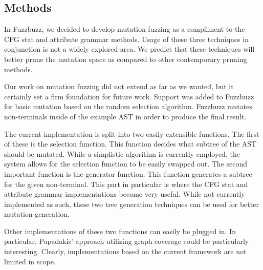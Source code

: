\subsection{Methods}

In Fuzzbuzz, we decided to develop mutation fuzzing as a compliment to
the CFG stat and attribute grammar methods. Usage of these three
techniques in conjunction is not a widely explored area. We predict
that these techniques will better prune the mutation space as compared
to other contemporary pruning methods.

Our work on mutation fuzzing did not extend as far as we wanted, but
it certainly set a firm foundation for future work. Support was added
to Fuzzbuzz for basic mutation based on the random selection
algorithm. Fuzzbuzz mutates non-terminals inside of the example AST in
order to produce the final result.

The current implementation is split into two easily extensible
functions. The first of these is the selection function. This function
decides what subtree of the AST should be mutated. While a simplistic
algorithm is currently employed, the system allows for the selection
function to be easily swapped out. The second important function is
the generator function. This function generates a subtree for the
given non-terminal. This part in particular is where the CFG stat and
attribute grammar implementations become very useful. While not
currently implemented as such, these two tree generation techniques
can be used for better mutation generation.

Other implementations of these two functions can easily be plugged
in. In particular, Papadakis' approach utilizing graph coverage could
be particularly interesting. Clearly, implementations based on the
current framework are not limited in scope.
